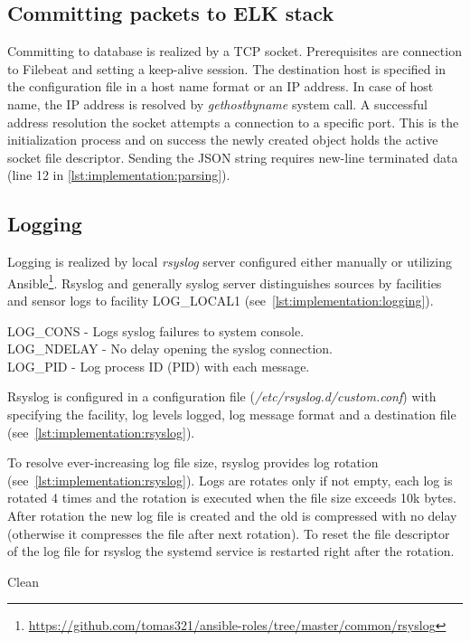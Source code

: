 \documentclass[12pt,a4paper,twoside]{report}
\begin{document}
		\subsection{Committing packets to ELK stack} \label{implementation:sensor:commit}
			Committing to database is realized by a TCP socket. Prerequisites are connection to Filebeat and setting a keep-alive session. The destination host is specified in the configuration file in a host name format or an IP address. In case of host name, the IP address is resolved by \emph{gethostbyname} system call. A successful address resolution the socket attempts a connection to a specific port. This is the initialization process and on success the newly created object holds the active socket file descriptor. Sending the JSON string requires new-line terminated data (line 12 in \autoref{lst:implementation:parsing}).	
		\subsection{Logging} \label{implementation:sensor:logging}
			Logging is realized by local \emph{rsyslog} server configured either manually or utilizing Ansible\footnote{\url{https://github.com/tomas321/ansible-roles/tree/master/common/rsyslog}}. Rsyslog and generally syslog server distinguishes sources by facilities \cite{man:syslog} and sensor logs to facility LOG\_LOCAL1 (see~\autoref{lst:implementation:logging}).
			
			LOG\_CONS - Logs syslog failures to system console.\\
			LOG\_NDELAY - No delay opening the syslog connection.\\
			LOG\_PID - Log process ID (PID) with each message.\par
			Rsyslog is configured in a configuration file (\emph{/etc/rsyslog.d/custom.conf}) with specifying the facility, log levels logged, log message format and a destination file (see~\autoref{lst:implementation:rsyslog}).
			\par
			To resolve ever-increasing log file size, rsyslog provides log rotation (see~\autoref{lst:implementation:rsyslog}). Logs are rotates only if not empty, each log is rotated 4 times and the rotation is executed when the file size exceeds 10k bytes. After rotation the new log file is created and the old is compressed with no delay (otherwise it compresses the file after next rotation). To reset the file descriptor of the log file for rsyslog the systemd service is restarted right after the rotation.
			
Clean
\end{document}
